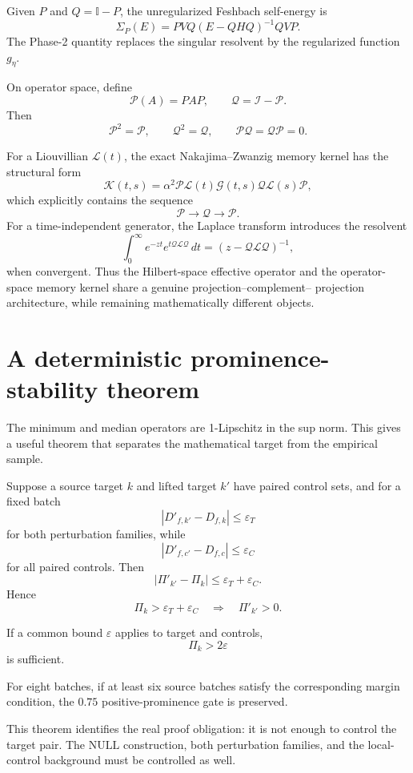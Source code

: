 \documentclass[11pt,a4paper]{article}
\newcommand{\Null}{\mathrm{NULL}}
\newcommand{\cL}{\mathcal L}
\newcommand{\cP}{\mathcal P}
\newcommand{\cQ}{\mathcal Q}
\newcommand{\cK}{\mathcal K}
\newcommand{\Id}{\mathbb I}
\newcommand{\eps}{\varepsilon}
\newcommand{\Prom}{\Pi}
\begin{document}
Given \(P\) and \(Q=\Id-P\), the unregularized Feshbach self-energy is
\[
\Sigma_P(E)
=
PVQ(E-QHQ)^{-1}QVP.
\]
The Phase-2 quantity replaces the singular resolvent by the regularized
function \(g_\eta\).

On operator space, define
\[
\cP(A)=PAP,
\qquad
\cQ=\mathcal I-\cP.
\]
Then
\[
\cP^2=\cP,
\qquad
\cQ^2=\cQ,
\qquad
\cP\cQ=\cQ\cP=0.
\]

For a Liouvillian \(\cL(t)\), the exact Nakajima--Zwanzig memory kernel has the
structural form
\[
\cK(t,s)
=
\alpha^2
\cP\cL(t)\mathcal G(t,s)\cQ\cL(s)\cP,
\]
which explicitly contains the sequence
\[
\cP\longrightarrow\cQ\longrightarrow\cP.
\]
For a time-independent generator, the Laplace transform introduces the
resolvent
\[
\int_0^\infty e^{-zt}e^{t\cQ\cL\cQ}\,dt
=
(z-\cQ\cL\cQ)^{-1},
\]
when convergent.  Thus the Hilbert-space effective operator and the
operator-space memory kernel share a genuine projection--complement--
projection architecture, while remaining mathematically different objects.

\section{A deterministic prominence-stability theorem}

The minimum and median operators are 1-Lipschitz in the sup norm.  This gives
a useful theorem that separates the mathematical target from the empirical
sample.

Suppose a source target \(k\) and lifted target \(k'\) have paired control
sets, and for a fixed batch
\[
|D'_{f,k'}-D_{f,k}|\le\eps_T
\]
for both perturbation families, while
\[
|D'_{f,c'}-D_{f,c}|\le\eps_C
\]
for all paired controls.  Then
\[
\boxed{
|\Prom'_{k'}-\Prom_k|
\le
\eps_T+\eps_C.
}
\]
Hence
\[
\Prom_k>\eps_T+\eps_C
\quad\Longrightarrow\quad
\Prom'_{k'}>0.
\]

If a common bound \(\eps\) applies to target and controls,
\[
\Prom_k>2\eps
\]
is sufficient.

For eight batches, if at least six source batches satisfy the corresponding
margin condition, the \(0.75\) positive-prominence gate is preserved.

This theorem identifies the real proof obligation: it is not enough to
control the target pair.  The \(\Null\) construction, both perturbation
families, and the local-control background must be controlled as well.
\end{document}
